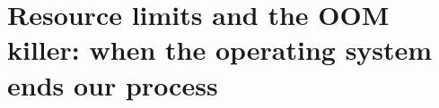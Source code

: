 \chapter{Resource limits and the OOM killer: when the operating system ends our process}
\label{ch:resource-limits-and-the-oom-killer-when}

